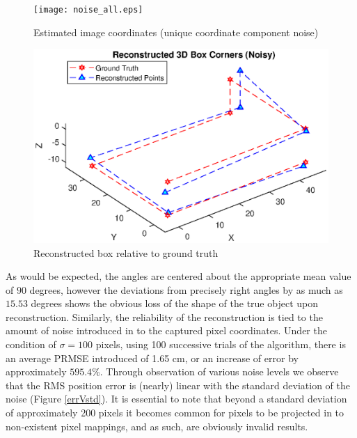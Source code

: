 \documentclass[12pt]{article}
\begin{document}
\begin{figure}[h]
	\centering %
	\captionsetup{justification=centering}
	\begin{minipage}{0.5\textwidth}
		\centering
		\texttt{[image: noise\_all.eps]}
		\caption{Estimated image coordinates \newline(unique coordinate component noise)} \label{noiseall}
	\end{minipage}\hfill
	\begin{minipage}{0.5\textwidth}
		\centering %
		\includegraphics[width=1\textwidth]{noise_all_recon.eps}
		\caption{Reconstructed box relative to ground truth} \label{noiseallrecon}
	\end{minipage}
\end{figure}
As would be expected, the angles are centered about the appropriate mean value of $90$ degrees, however the deviations from precisely right angles by as much as $15.53$ degrees shows the obvious loss of the shape of the true object upon reconstruction. Similarly, the reliability of the reconstruction is tied to the amount of noise introduced in to the captured pixel coordinates. Under the condition of $\sigma = 100$ pixels, using 100 successive trials of the algorithm, there is an average PRMSE introduced of 1.65 cm, or an increase of error by approximately $595.4\%$. Through observation of various noise levels we observe that the RMS position error is (nearly) linear with the standard deviation of the noise (Figure \ref{errVstd}). It is essential to note that beyond a standard deviation of approximately 200 pixels it becomes common for pixels to be projected in to non-existent pixel mappings, and as such, are obviously invalid results. 
\end{document}
